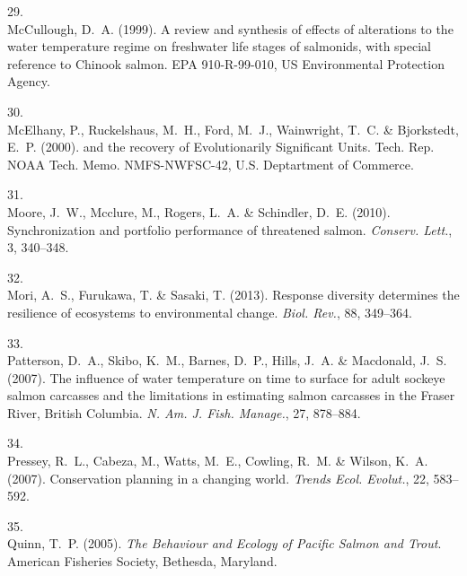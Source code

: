 \documentclass[11pt]{article}
\begin{document}
\begin{spacing}{1.6}
\begin{thebibliography}{50}
29.\\
McCullough, D.~A. (1999).
\newblock A review and synthesis of effects of alterations to the water
  temperature regime on freshwater life stages of salmonids, with special
  reference to {Chinook} salmon.
\newblock EPA 910-R-99-010, US Environmental Protection Agency.

30.\\
McElhany, P., Ruckelshaus, M.~H., Ford, M.~J., Wainwright, T.~C. \& Bjorkstedt,
  E.~P. (2000).
 and the recovery of {Evolutionarily
  Significant Units}.
\newblock Tech. Rep. NOAA Tech. Memo. NMFS-NWFSC-42, U.S. Deptartment of
  Commerce.

31.\\
Moore, J.~W., Mcclure, M., Rogers, L.~A. \& Schindler, D.~E. (2010).
\newblock Synchronization and portfolio performance of threatened salmon.
\newblock \emph{Conserv. Lett.}, 3, 340--348.

32.\\
Mori, A.~S., Furukawa, T. \& Sasaki, T. (2013).
\newblock Response diversity determines the resilience of ecosystems to
  environmental change.
\newblock \emph{Biol. Rev.}, 88, 349--364.

33.\\
Patterson, D.~A., Skibo, K.~M., Barnes, D.~P., Hills, J.~A. \& Macdonald, J.~S.
  (2007).
\newblock The influence of water temperature on time to surface for adult
  sockeye salmon carcasses and the limitations in estimating salmon carcasses
  in the {Fraser River, British Columbia}.
\newblock \emph{N. Am. J. Fish. Manage.}, 27, 878--884.

34.\\
Pressey, R.~L., Cabeza, M., Watts, M.~E., Cowling, R.~M. \& Wilson, K.~A.
  (2007).
\newblock Conservation planning in a changing world.
\newblock \emph{Trends Ecol. Evolut.}, 22, 583--592.

35.\\
Quinn, T.~P. (2005).
\newblock \emph{The Behaviour and Ecology of Pacific Salmon and Trout}.
\newblock American Fisheries Society, Bethesda, Maryland.


\end{thebibliography}
\end{spacing}
\end{document}
